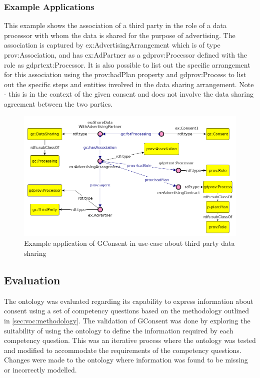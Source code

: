 \subsubsection{Example Applications}
This example shows the association of a third party in the role of a data processor with whom the data is shared for the purpose of advertising. The association is captured by ex:AdvertisingArrangement which is of type prov:Association, and has ex:AdPartner as a gdprov:Processor defined with the role as gdprtext:Processor. It is also possible to list out the specific arrangement for this association using the prov:hadPlan property and gdprov:Process to list out the specific steps and entities involved in the data sharing arrangement. Note - this is in the context of the given consent and does not involve the data sharing agreement between the two parties.
\begin{figure}[htbp]
    \centering
    \includegraphics[width=0.8\linewidth]{img/gconsent_third_party_datasharing.png}
    \caption{Example application of GConsent in use-case about third party data sharing \cite{}}
    \label{fig:vocabs:gconsent-example}
\end{figure}

\subsection{Evaluation}
The ontology was evaluated regarding its capability to express information about consent using a set of competency questions based on the methodology outlined in \autoref{sec:voc:methodology}.
The validation of GConsent was done by exploring the suitability of using the ontology to define the information required by each competency question.
This was an iterative process where the ontology was tested and modified to accommodate the requirements of the competency questions. Changes were made to the ontology where information was found to be missing or incorrectly modelled. 

